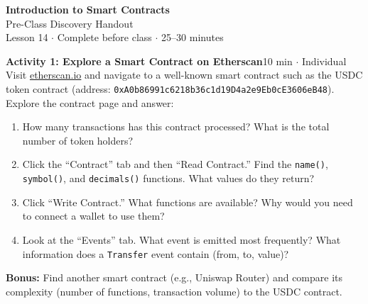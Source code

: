 \documentclass[11pt,a4paper]{article}
\newcommand{\activitybox}[3]{%
  \noindent\colorbox{mllavender4}{\parbox{\dimexpr\linewidth-2\fboxsep}{%
    \textbf{\color{mlpurple}#1}\hfill\textcolor{mlgray}{\small #2}\\[2pt]#3%
  }}\par\vspace{4pt}%
}
\begin{document}
\begin{center}
{\LARGE\color{mlpurple}\textbf{Introduction to Smart Contracts}}\\[4pt]
{\large\color{mlblue}Pre-Class Discovery Handout}\\[2pt]
{\small\color{mlgray}Lesson 14 $\cdot$ Complete before class $\cdot$ 25--30 minutes}
\end{center}
\vspace{4pt}

\activitybox{Activity 1: Explore a Smart Contract on Etherscan}{10 min $\cdot$ Individual}{%
Visit \href{https://etherscan.io}{etherscan.io} and navigate to a well-known smart contract such as the USDC token contract (address: \texttt{0xA0b86991c6218b36c1d19D4a2e9Eb0cE3606eB48}). Explore the contract page and answer:
\begin{enumerate}
\item How many transactions has this contract processed? What is the total number of token holders?
\item Click the ``Contract'' tab and then ``Read Contract.'' Find the \texttt{name()}, \texttt{symbol()}, and \texttt{decimals()} functions. What values do they return?
\item Click ``Write Contract.'' What functions are available? Why would you need to connect a wallet to use them?
\item Look at the ``Events'' tab. What event is emitted most frequently? What information does a \texttt{Transfer} event contain (from, to, value)?
\end{enumerate}
\textbf{Bonus:} Find another smart contract (e.g., Uniswap Router) and compare its complexity (number of functions, transaction volume) to the USDC contract.
}

\vspace{2pt}
\end{document}
